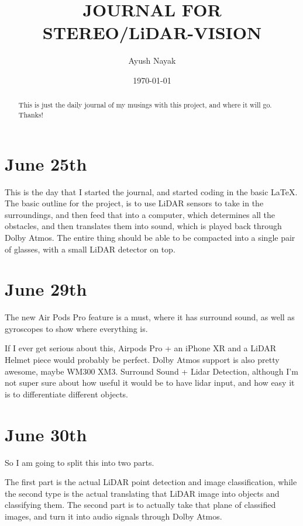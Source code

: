 \documentclass{article}
\begin{document}
\title{JOURNAL FOR STEREO/LiDAR-VISION}
\author{Ayush Nayak}
\date{\today}

\maketitle

\begin{abstract}
    This is just the daily journal of my musings with this project, and where it will go. Thanks!
\end{abstract}

\newpage

\section{June 25th}

This is the day that I started the journal, and started coding in the basic \LaTeX. The basic outline for the project, is to use LiDAR sensors to take in the surroundings, and then feed that into a computer, which determines all the obstacles, and then translates them into sound, which is played back through Dolby Atmos. The entire thing should be able to be compacted into a single pair of glasses, with a small LiDAR detector on top.

\section{June 29th}

The new Air Pods Pro feature is a must, where it has surround sound, as well as gyroscopes to show where everything is.

If I ever get serious about this, Airpods Pro + an iPhone XR and a LiDAR Helmet piece would probably be perfect. Dolby Atmos support is also pretty awesome, maybe WM300 XM3. Surround Sound + Lidar Detection, although I'm not super sure about how useful it would be to have lidar input, and how easy it is to differentiate different objects.

\section{June 30th}
So I am going to split this into two parts.

The first part is the actual LiDAR point detection and image classification, while the second type is the actual translating that LiDAR image into objects and classifying them. The second part is to actually take that plane of classified images, and turn it into audio signals through Dolby Atmos. 
\end{document}
